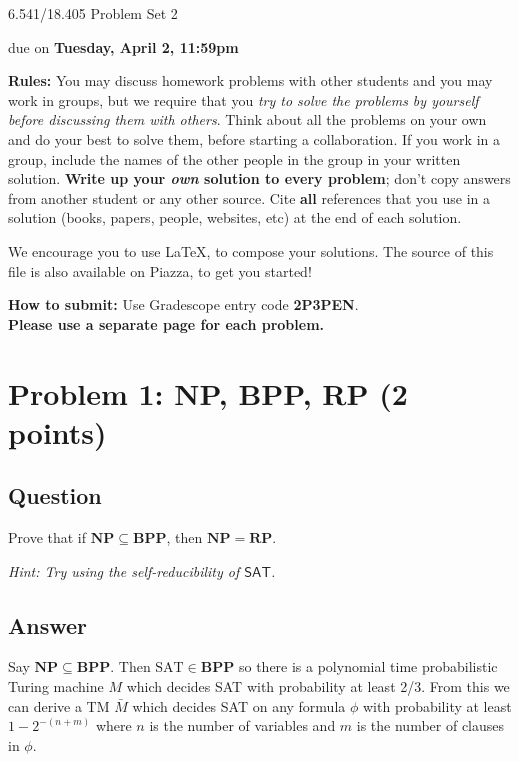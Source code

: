 \documentclass{article}
\newcommand{\NP}{\mathbf{NP}}
\newcommand{\BPP}{\mathbf{BPP}}
\newcommand{\RP}{\mathbf{RP}}
\begin{document}
	
	
	\begin{center}
		\Large
		6.541/18.405 Problem Set 2
		
		\vspace{3pt}
		\normalsize
		due on {\bf Tuesday, April 2, 11:59pm}
	\end{center}
	
	{\bf Rules:} You may discuss homework problems with other students and you may work in groups, but we require that you {\em try to solve the problems by yourself before discussing them with others}. Think about all the problems on your own and do your best to solve them, before starting a collaboration. If you work in a group, include the names of the other people in the group in your written solution. {\bf Write up your {\em own} solution to every problem}; don't copy answers from another student or any other source. Cite {\bf all} references that you use in a solution (books, papers, people, websites, etc) at the end of each solution. 
	
	We encourage you to use \LaTeX, to compose your solutions. The source of this file is also available on Piazza, to get you started!
	
	{\bf How to submit:} Use Gradescope entry code \textbf{2P3PEN}.\\ \textbf{\large Please use a separate page for each problem.} 

\newpage
\section*{Problem 1: NP, BPP, RP (2 points)}

\subsection*{Question}
Prove that if $\NP \subseteq \BPP$, then $\NP = \RP$.

\emph{Hint: Try using the self-reducibility of $\mathsf{SAT}$.}

\subsection*{Answer}
Say $\NP \subseteq \BPP$.  Then $\text{SAT} \in \BPP$ so there is a polynomial time probabilistic Turing machine $M$ which decides SAT with probability at least 2/3.
From this we can derive a TM $\bar{M}$ which decides SAT on any formula $\phi$ with probability at least $1 - 2^{-(n + m)}$ where $n$ is the number of variables and $m$ is the number of clauses in $\phi$.
\end{document}
